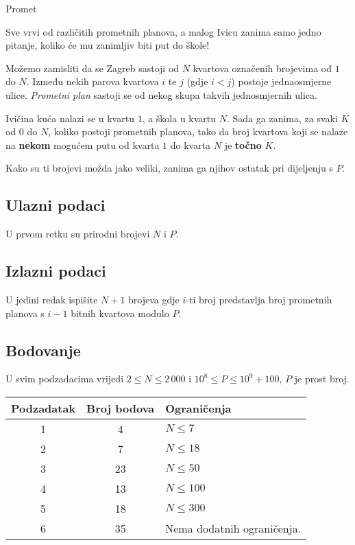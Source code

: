 \begin{statement}[
  problempoints=100,
  timelimit=2 sekunde,
  memorylimit=1024 MiB,
]{Promet}\

Sve vrvi od različitih prometnih planova, a malog Ivicu zanima samo jedno pitanje, koliko će mu zanimljiv biti put do škole!

Možemo zamisliti da se Zagreb sastoji od $N$ kvartova označenih brojevima od $1$ do $N$. Između nekih parova kvartova $i$ te $j$ (gdje $i < j$) postoje jednaosmjerne ulice. \textit{Prometni plan} sastoji se od nekog skupa takvih jednosmjernih ulica. 

Ivičina kuća nalazi se u kvartu $1$, a škola u kvartu $N$. Sada ga zanima, za svaki $K$ od $0$ do $N$, koliko postoji prometnih planova, tako da broj kvartova koji se nalaze na \textbf{nekom} mogućem putu od kvarta $1$ do kvarta $N$ je \textbf{točno} $K$.

Kako su ti brojevi možda jako veliki, zanima ga njihov ostatak pri dijeljenju s $P$.


\subsection*{Ulazni podaci}

U prvom retku su prirodni brojevi $N$ i $P$.

\subsection*{Izlazni podaci}

U jedini redak ispišite $N + 1$ brojeva gdje $i$-ti broj predstavlja broj prometnih planova s $i - 1$ bitnih kvartova modulo $P$.

\subsection*{Bodovanje}

U svim podzadacima vrijedi $2 \leq N \leq 2\,000$ i $10^8 \leq P \leq 10^9 + 100$, $P$ je prost broj.

{\renewcommand{\arraystretch}{1.4}
  \setlength{\tabcolsep}{6pt}
  \begin{tabular}{ccl}
   Podzadatak & Broj bodova & Ograničenja \\ \midrule
   	1 & 4 & $N \leq 7$ \\
    2 & 7 & $N \leq 18$ \\
    3 & 23 & $N \leq 50$ \\
    4 & 13 & $N \leq 100$ \\
    5 & 18 & $N \leq 300$ \\
    6 & 35 & Nema dodatnih ograničenja. \\
\end{tabular}}


\end{statement}
